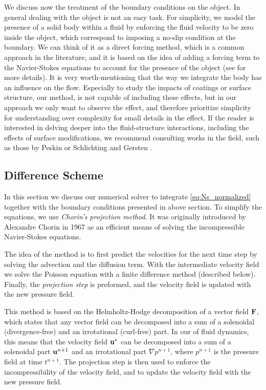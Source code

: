 We discuss now the treatment of the boundary conditions on the object. In general dealing with the object is not an easy task. For simplicity, we model the presence of a solid body within a fluid by enforcing the fluid velocity to be zero inside the object, which correspond to imposing a no-slip condition at the boundary. We can think of it as a direct forcing method, which is a common approach in the literature, and it is based on the idea of adding a forcing term to the Navier-Stokes equations to account for the presence of the object (see \cite{forcing} for more details).
It is very worth-mentioning that the way we integrate the body has an influence on the flow. Especially to study the impacts of coatings or surface structure, our method, is not capable of including these effects, but in our approach we only want to observe the effect, and therefore prioritize simplicity for understanding over complexity for small details in the effect. If the reader is interested in delving deeper into the fluid-structure interactions, including the effects of surface modifications, we recommend consulting works in the field, such as those by Peskin \cite{Peskin1977ImmersedBM} or Schlichting and Gersten \cite{Schlichting2000BoundaryLayerT}.

\subsection{Difference Scheme} \label{sec: diffScheme}
In this section we discuss our numerical solver to integrate \cref{eq:Ns_normalized} together with the boundary conditions presented in above section. To simplify the equations, we use \textit{Chorin's projection method}. It was originally introduced by Alexandre Chorin in 1967 \cite{Chorin1967NumericalNS} as an efficient means of solving the incompressible Navier-Stokes equations.

The idea of the method is to first predict the velocities for the next time step by solving the advection and the diffusion term. With the intermediate velocity field we solve the Poisson equation with a finite difference method (described below). Finally, the \textit{projection step} is preformed, and the velocity field is updated with the new pressure field.

This method is based on the Helmholtz-Hodge decomposition of a vector field $\boldsymbol{\mathrm{F}}$, which states that any vector field can be decomposed into a sum of a solenoidal (divergence-free) and an irrotational (curl-free) part. In our of fluid dynamics, this means that the velocity field $\boldsymbol{\mathrm{u}}^*$ can be decomposed into a sum of a solenoidal part $\boldsymbol{\mathrm{u}}^{n+1}$ and an irrotational part $\nabla p^{n+1}$, where $p^{n+1}$ is the pressure field at time $t^{n+1}$. The projection step is then used to enforce the incompressibility of the velocity field, and to update the velocity field with the new pressure field. 

